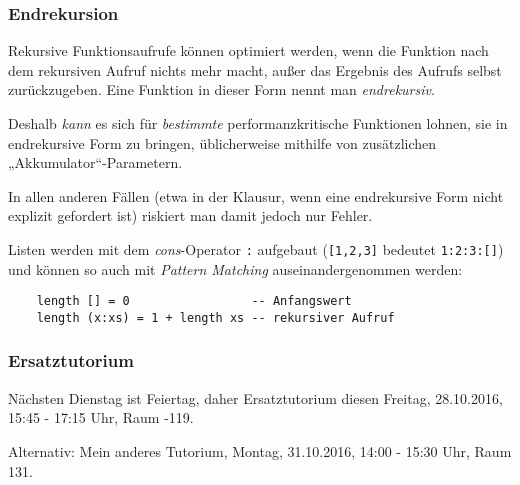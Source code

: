 \documentclass{beamer}
\begin{document}
\begin{frame}
  \frametitle{Endrekursion}
  Rekursive Funktionsaufrufe können optimiert werden,
  wenn die Funktion nach dem rekursiven Aufruf nichts mehr macht,
  außer das Ergebnis des Aufrufs selbst zurückzugeben.
  Eine Funktion in dieser Form nennt man \emph{endrekursiv}.
  
  Deshalb \emph{kann} es sich für \emph{bestimmte} performanzkritische Funktionen lohnen,
  sie in endrekursive Form zu bringen,
  üblicherweise mithilfe von zusätzlichen „Akkumulator“-Parametern.
  
  In allen anderen Fällen
  (etwa in der Klausur, wenn eine endrekursive Form nicht explizit gefordert ist)
  riskiert man damit jedoch nur Fehler.
\end{frame}

\begin{frame}[fragile]
  Listen werden mit dem \emph{cons}-Operator \lstinline{:} aufgebaut
  (\lstinline{[1,2,3]} bedeutet \lstinline{1:2:3:[]})
  und können so auch mit \emph{Pattern Matching} auseinandergenommen werden:
  
  \begin{lstlisting}
    length [] = 0                 -- Anfangswert
    length (x:xs) = 1 + length xs -- rekursiver Aufruf
  \end{lstlisting}
\end{frame}

\begin{frame}
  \frametitle{Ersatztutorium}
  Nächsten Dienstag ist Feiertag, daher Ersatztutorium diesen Freitag, 28.10.2016, 15:45 - 17:15 Uhr, Raum -119.
  
  Alternativ: Mein anderes Tutorium, Montag, 31.10.2016, 14:00 - 15:30 Uhr, Raum 131.
\end{frame}
\end{document}
